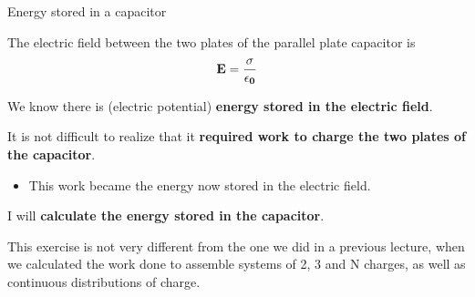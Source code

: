 %
%
%

\begin{frame}{Energy stored in a capacitor}

The electric field between the two plates of the parallel plate capacitor is
\begin{equation*}
   {\bf E = \frac{\sigma}{\epsilon_0}}
\end{equation*}

We know there is (electric potential) {\bf energy stored in the electric field}.

\vspace{0.2cm}

It is not difficult to realize that it
{\bf required work to charge the two plates of the capacitor}.
\begin{itemize}
  \item This work became the energy now stored in the electric field.
\end{itemize}

\vspace{0.2cm}

I will {\bf calculate the energy stored in the capacitor}.

\begin{itemize}
{\small
 \item
  This exercise is not very different from the one we did in a previous lecture,
  when we calculated the work done to assemble systems of 2, 3 and N charges, as well as
  continuous distributions of charge.
}
\end{itemize}

\end{frame}


%
%
%

